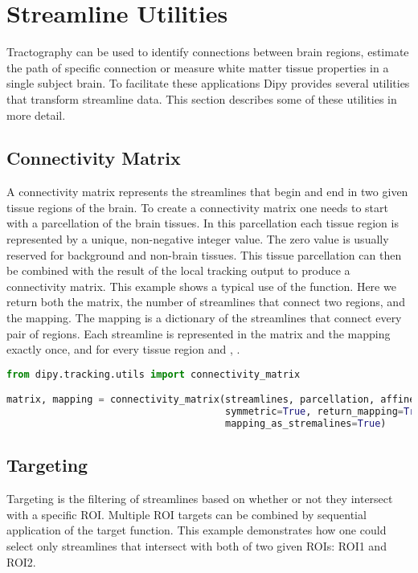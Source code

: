 \section{Streamline Utilities}

Tractography can be used to identify connections between brain regions, estimate the path of specific connection or measure white matter tissue properties in a single subject brain. To facilitate these applications Dipy provides several utilities that transform streamline data. This section describes some of these utilities in more detail.

\subsection{Connectivity Matrix}
A connectivity matrix represents the streamlines that begin and end in two given tissue regions of the brain. To create a connectivity matrix one needs to start with a parcellation of the brain tissues. In this parcellation each tissue region is represented by a unique, non-negative integer value. The zero value is usually reserved for background and non-brain tissues. This tissue parcellation can then be combined with the result of the local tracking output to produce a connectivity matrix. This example shows a typical use of the  function. Here we return both the matrix, the number of streamlines that connect two regions, and the mapping. The mapping is a dictionary of the streamlines that connect every pair of regions. Each streamline is represented in the matrix and the mapping exactly once, and for every tissue region  and , .

\begin{lstlisting}[language=python]
from dipy.tracking.utils import connectivity_matrix

matrix, mapping = connectivity_matrix(streamlines, parcellation, affine=affine,
                                      symmetric=True, return_mapping=True,
                                      mapping_as_stremalines=True)
\end{lstlisting}

\subsection{Targeting}
Targeting is the filtering of streamlines based on whether or not they intersect with a specific ROI. Multiple ROI targets can be combined by sequential application of the target function. This example demonstrates how one could select only streamlines that intersect with both of two given ROIs: ROI1 and ROI2.

